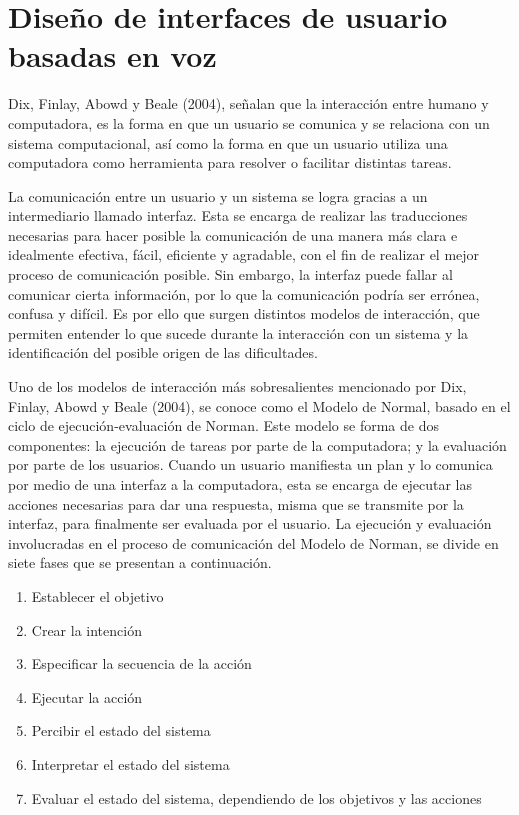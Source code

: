 
\chapter{Diseño de interfaces de usuario basadas en voz}
\label{capIII}

Dix, Finlay, Abowd y Beale (2004), señalan que la interacción entre humano y computadora, es la forma en que un usuario se comunica y se relaciona con un sistema computacional, así como la forma en que un usuario utiliza una computadora como herramienta para resolver o facilitar distintas tareas.

La comunicación entre un usuario y un sistema se logra gracias a un intermediario llamado interfaz. Esta se encarga de realizar las traducciones necesarias para hacer posible la comunicación de una manera más clara e idealmente efectiva, fácil, eficiente y agradable, con el fin de realizar el mejor proceso de comunicación posible. Sin embargo, la interfaz puede fallar al comunicar cierta información, por lo que la comunicación podría ser errónea, confusa y difícil. Es por ello que surgen distintos modelos de interacción, que permiten entender lo que sucede durante la interacción con un sistema y la identificación del posible origen de las dificultades.

Uno de los modelos de interacción más sobresalientes mencionado por Dix, Finlay, Abowd y Beale (2004), se conoce como el Modelo de Normal, basado en el ciclo de ejecución-evaluación de Norman. Este modelo se forma de dos componentes: la ejecución de tareas por parte de la computadora; y la evaluación por parte de los usuarios. Cuando un usuario manifiesta un plan y lo comunica por medio de una interfaz a la computadora, esta se encarga de ejecutar las acciones necesarias para dar una respuesta, misma que se transmite por la interfaz, para finalmente ser evaluada por el usuario. La ejecución  y evaluación involucradas en el proceso de comunicación del Modelo de Norman, se divide en siete fases que se presentan a continuación.

\begin{enumerate}
  \item Establecer el objetivo
  \item Crear la intención
  \item Especificar la secuencia de la acción
  \item Ejecutar la acción
  \item Percibir el estado del sistema
  \item Interpretar el estado del sistema
  \item Evaluar el estado del sistema, dependiendo de los objetivos y las acciones
\end{enumerate}

